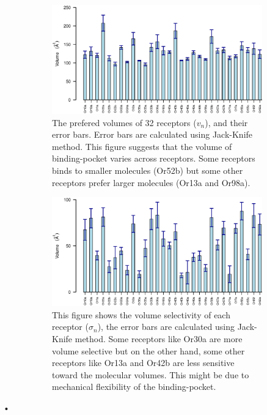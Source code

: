 \documentclass[11pt]{paper} %
\newcommand{\numberofreceptors}{32 }
\begin{document}
\begin{figure}
	\begin{subfigure}[b]{\textwidth}
		\includegraphics[width=\textwidth]{fig/mean-vol}
		\caption{The prefered volumes of \numberofreceptors receptors ($v_n$), and their error bars. Error bars are calculated using Jack-Knife method. 
		This figure suggests that the volume of binding-pocket varies across receptors. 
		Some receptors binds to smaller molecules (Or52b) but some other receptors prefer larger molecules (Or13a and Or98a).}
		\label{fig:preferred_volume}
	\end{subfigure}
	\begin{subfigure}[b]{\textwidth}
		\includegraphics[width=\textwidth]{fig/std-vol}
		\caption{This figure shows the volume selectivity of each receptor ($\sigma_n$), the error bars are calculated using Jack-Knife method.
		Some receptors like Or30a are more volume selective but on the other hand, some other receptors like Or13a and Or42b are less sensitive toward the molecular volumes.
		This might be due to mechanical flexibility of the binding-pocket.}
		\label{fig:volume_selectivity}
	\end{subfigure}
	\caption{}
\end{figure}•
\end{document}
